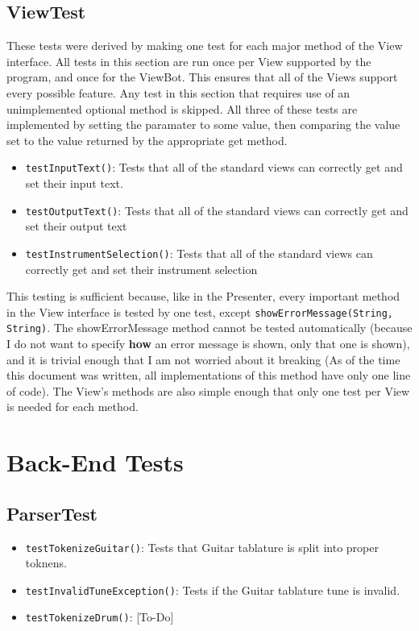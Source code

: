 \documentclass[11pt]{article}
\begin{document}
\subsection{ViewTest}
\label{sec:org4785afc}
These tests were derived by making one test for each major method of the View interface.
All tests in this section are run once per View supported by the program, and once for the ViewBot.  This ensures that all of the Views support every possible feature.  Any test in this section that requires use of an unimplemented optional method is skipped.  
All three of these tests are implemented by setting the paramater to some value, then comparing the value set to the value returned by the appropriate get method.
\begin{itemize}
\item \texttt{testInputText()}: Tests that all of the standard views can correctly get and set their input text.
\item \texttt{testOutputText()}: Tests that all of the standard views can correctly get and set their output text
\item \texttt{testInstrumentSelection()}: Tests that all of the standard views can correctly get and set their instrument selection
\end{itemize}

This testing is sufficient because, like in the Presenter, every important method in the View interface is tested by one test, except \texttt{showErrorMessage(String, String)}.  The showErrorMessage method cannot be tested automatically (because I do not want to specify \textbf{how} an error message is shown, only that one is shown), and it is trivial enough that I am not worried about it breaking (As of the time this document was written, all implementations of this method have only one line of code).  The View's methods are also simple enough that only one test per View is needed for each method.

\section{Back-End Tests}
\label{sec:org59efecd}
\subsection{ParserTest}
\label{sec:orge96173a}
\begin{itemize}
\item \texttt{testTokenizeGuitar()}: Tests that Guitar tablature is split into proper toknens.
\item \texttt{testInvalidTuneException()}: Tests if the Guitar tablature tune is invalid.
\item \texttt{testTokenizeDrum()}: [To-Do]
\end{itemize}
\end{document}

